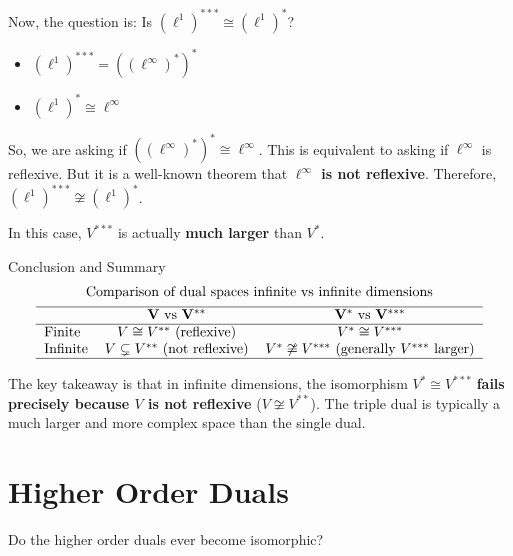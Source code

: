 \documentclass[aps,preprint]{revtex4}
\newenvironment{question}
  {\begin{tcolorbox}[colback=blue!5!white,colframe=blue!75!black,title=Question]}
  {\end{tcolorbox}}
\newenvironment{answer}
  {\begin{tcolorbox}[colback=green!5!white,colframe=green!75!black,title=Answer]}
  {\end{tcolorbox}}
\begin{document}
\begin{answer}
Now, the question is: Is $(\ell^1)^{***} \cong (\ell^1)^*$?

\begin{itemize}
\item $(\ell^1)^{***} = ((\ell^\infty)^*)^*$

\item $(\ell^1)^* \cong \ell^\infty$
\end{itemize}

So, we are asking if $((\ell^\infty)^*)^* \cong \ell^\infty$. This is
equivalent to asking if $\ell^\infty$ is reflexive. But it is a well-known
theorem that \textbf{$\ell^\infty$ is not reflexive}. Therefore, $%
(\ell^1)^{***} \not\cong (\ell^1)^*$.

In this case, $V^{***}$ is actually \textbf{much larger} than $V^*$.

Conclusion and Summary%
\begin{gather*}
\text{Comparison of dual spaces infinite vs infinite dimensions} \\
\begin{tabular}{lcc}
\hline
& $\mathbf{V}$ vs $\mathbf{V^{\ast \ast }}$ & $\mathbf{V^{\ast }}$ vs $%
\mathbf{V^{\ast \ast \ast }}$ \\ \hline
Finite & $V\cong V^{\ast \ast }$ (reflexive) & $V^{\ast }\cong V^{\ast \ast
\ast }$ \\ 
Infinite & $V\subsetneq V^{\ast \ast }$ (not reflexive) & $V^{\ast
}\not\cong V^{\ast \ast \ast }$ (generally $V^{\ast \ast \ast }$ larger) \\ 
\hline
\end{tabular}%
\end{gather*}

The key takeaway is that in infinite dimensions, the isomorphism $V^* \cong
V^{***}$ \textbf{fails precisely because $V$ is not reflexive} ($V \not\cong
V^{**}$). The triple dual is typically a much larger and more complex space
than the single dual.
\end{answer}

\section{Higher Order Duals}

\begin{question}
Do the higher order duals ever become isomorphic?
\end{question}
\end{document}
